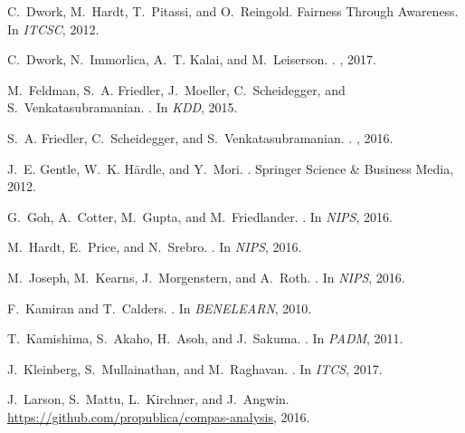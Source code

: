 \documentclass{article}
\begin{document}
\begin{thebibliography}{10}
C.~Dwork, M.~Hardt, T.~Pitassi, and O.~Reingold.
\newblock Fairness {T}hrough {A}wareness.
\newblock In {\em ITCSC}, 2012.

C.~Dwork, N.~Immorlica, A.~T. Kalai, and M.~Leiserson.
.
, 2017.

M.~Feldman, S.~A. Friedler, J.~Moeller, C.~Scheidegger, and
  S.~Venkatasubramanian.
.
\newblock In {\em KDD}, 2015.

S.~A. Friedler, C.~Scheidegger, and S.~Venkatasubramanian.
.
, 2016.

J.~E. Gentle, W.~K. H{\"a}rdle, and Y.~Mori.
.
\newblock Springer Science \& Business Media, 2012.

G.~Goh, A.~Cotter, M.~Gupta, and M.~Friedlander.
.
\newblock In {\em {NIPS}}, 2016.

M.~Hardt, E.~Price, and N.~Srebro.
.
\newblock In {\em {NIPS}}, 2016.

M.~Joseph, M.~Kearns, J.~Morgenstern, and A.~Roth.
.
\newblock In {\em NIPS}, 2016.

F.~Kamiran and T.~Calders.
.
\newblock In {\em {BENELEARN}}, 2010.

T.~Kamishima, S.~Akaho, H.~Asoh, and J.~Sakuma.
.
\newblock In {\em {PADM}}, 2011.

J.~Kleinberg, S.~Mullainathan, and M.~Raghavan.
.
\newblock In {\em ITCS}, 2017.

J.~Larson, S.~Mattu, L.~Kirchner, and J.~Angwin.
\newblock
  \href{https://github.com/propublica/compas-analysis}{https://github.com/propublica/compas-analysis},
  2016.


\end{thebibliography}
\end{document}
